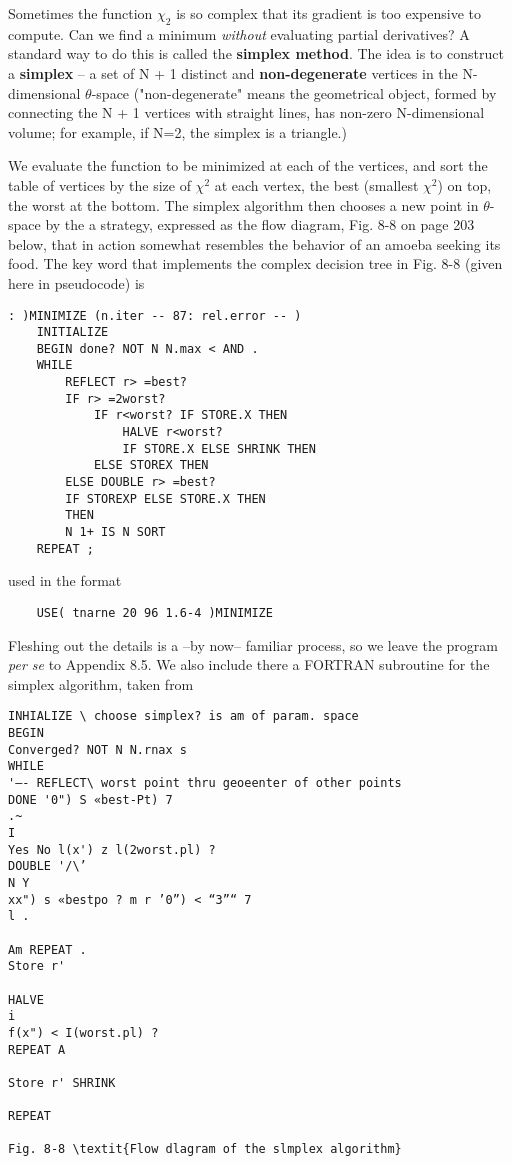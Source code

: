 Sometimes the function $\chi_{2}$ is so complex that its gradient is too expensive to compute. Can we find a minimum \textit{without} evaluating partial derivatives? A standard way to do this is called the \textbf{simplex method}. The idea is to construct a \textbf{simplex} -- a set of N + 1 distinct and \textbf{non-degenerate} vertices in the N-dimensional $\theta$-space ("non-degenerate" means the geometrical object, formed by connecting the N + 1 vertices with straight lines, has non-zero N-dimensional volume; for example, if N=2, the simplex is a triangle.)

We evaluate the function to be minimized at each of the vertices, and sort the table of vertices by the size of $\chi^{2}$ at each vertex, the best (smallest $\chi^{2}$) on top, the worst at the bottom. The simplex algorithm then chooses a new point in $\theta$-space by the a strategy, expressed as the ﬂow diagram, Fig. 8-8 on page 203 below, that in action somewhat resembles the behavior of an amoeba seeking its food. The key word  that implements the complex decision tree in Fig. 8-8 (given here in pseudocode) is

\begin{lstlisting}
: )MINIMIZE (n.iter -- 87: rel.error -- )
    INITIALIZE
    BEGIN done? NOT N N.max < AND .
    WHILE
        REFLECT r> =best?
        IF r> =2worst?
            IF r<worst? IF STORE.X THEN
                HALVE r<worst?
                IF STORE.X ELSE SHRINK THEN
            ELSE STOREX THEN
        ELSE DOUBLE r> =best?
        IF STOREXP ELSE STORE.X THEN
        THEN
        N 1+ IS N SORT
    REPEAT ;
\end{lstlisting}

used in the format

\begin{lstlisting}
    USE( tnarne 20 96 1.6-4 )MINIMIZE
\end{lstlisting}

Fleshing out the details is a --by now-- familiar process, so we leave the program \textit{per se} to Appendix 8.5. We also include there a FORTRAN subroutine for the simplex algorithm, taken from

\begin{lstlisting}
INHIALIZE \ choose simplex? is am of param. space
BEGIN
Converged? NOT N N.rnax s
WHILE
'—- REFLECT\ worst point thru geoeenter of other points
DONE '0") S «best-Pt) 7
.~
I
Yes No l(x') z l(2worst.pl) ?
DOUBLE '/\’
N Y
xx") s «bestpo ? m r ’0”) < “3”“ 7
l .

Am REPEAT .
Store r'

HALVE
i
f(x") < I(worst.pl) ?
REPEAT A

Store r' SHRINK

REPEAT

Fig. 8-8 \textit{Flow dlagram of the slmplex algorithm}
\end{lstlisting}

